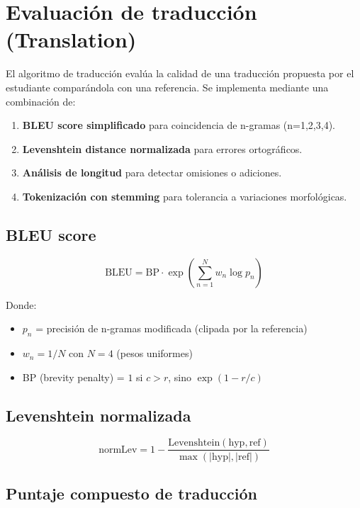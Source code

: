 \documentclass[10pt,a4paper,oneside]{report}
\begin{document}
\section{Evaluación de traducción (Translation)}
El algoritmo de traducción evalúa la calidad de una traducción propuesta por el estudiante comparándola con una referencia. Se implementa mediante una combinación de:

\begin{enumerate}[leftmargin=1.6em]
\item \textbf{BLEU score simplificado} para coincidencia de n-gramas (n=1,2,3,4).
\item \textbf{Levenshtein distance normalizada} para errores ortográficos.
\item \textbf{Análisis de longitud} para detectar omisiones o adiciones.
\item \textbf{Tokenización con stemming} para tolerancia a variaciones morfológicas.
\end{enumerate}

\subsection{BLEU score}

\begin{equation}
\text{BLEU} = \text{BP} \cdot \exp\left(\sum_{n=1}^{N} w_n \log p_n\right)
\end{equation}

Donde:
\begin{itemize}[leftmargin=1.4em]
\item $p_n$ = precisión de n-gramas modificada (clipada por la referencia)
\item $w_n = 1/N$ con $N=4$ (pesos uniformes)
\item BP (brevity penalty) = $1$ si $c > r$, sino $\exp(1 - r/c)$
\end{itemize}

\subsection{Levenshtein normalizada}

\begin{equation}
\text{normLev} = 1 - \frac{\text{Levenshtein}(\text{hyp}, \text{ref})}{\max(|\text{hyp}|, |\text{ref}|)}
\end{equation}

\subsection{Puntaje compuesto de traducción}
\end{document}
